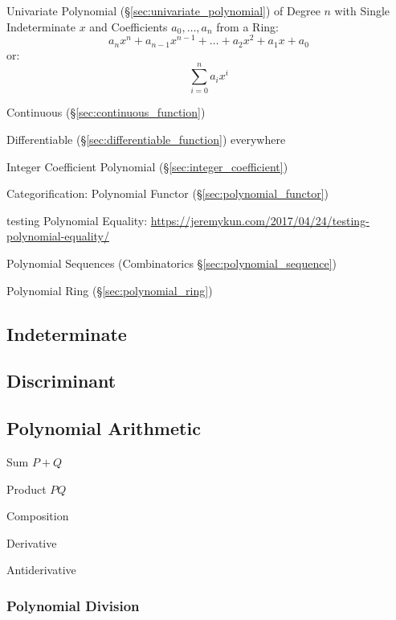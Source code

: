 Univariate Polynomial (\S\ref{sec:univariate_polynomial}) of Degree
$n$ with Single Indeterminate $x$ and Coefficients $a_0, \ldots, a_n$
from a Ring:
\[
  a_n x^n + a_{n-1} x^{n-1} + \ldots + a_2 x^2 + a_1 x + a_0
\]
or:
\[
  \sum_{i=0}^n a_i x^i
\]

Continuous (\S\ref{sec:continuous_function})

Differentiable (\S\ref{sec:differentiable_function}) everywhere

Integer Coefficient Polynomial (\S\ref{sec:integer_coefficient})

Categorification: Polynomial Functor (\S\ref{sec:polynomial_functor})

testing Polynomial Equality:
\url{https://jeremykun.com/2017/04/24/testing-polynomial-equality/}

\fist Polynomial Sequences (Combinatorics \S\ref{sec:polynomial_sequence})

\fist Polynomial Ring (\S\ref{sec:polynomial_ring})



\subsection{Indeterminate}\label{sec:indeterminate}

\subsection{Discriminant}\label{sec:discriminant}

\subsection{Polynomial Arithmetic}\label{sec:polynomial_arithmetic}

Sum $P + Q$

Product $P Q$

Composition

Derivative

Antiderivative



\subsubsection{Polynomial Division}\label{sec:polynomial_division}


